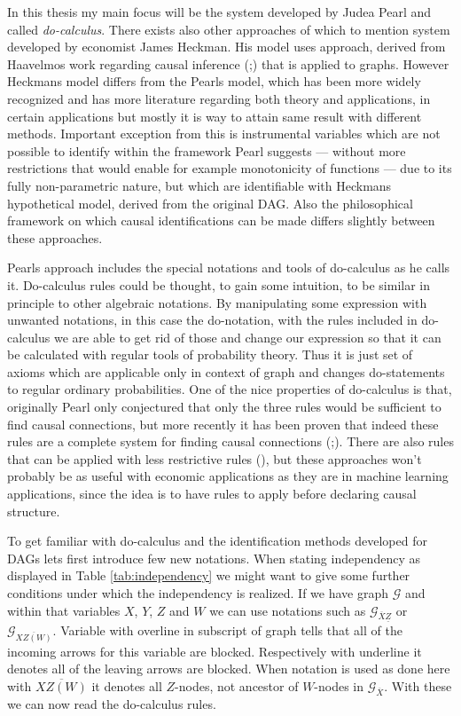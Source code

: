 \documentclass[main=english,12pt,a4paper,pdftex,econ,utf8]{aaltothesis}
\newcommand{\g}{\mathcal{G}}
\begin{document}


In this thesis my main focus will be the system developed by Judea Pearl and called \textit{do-calculus}. There exists also other approaches of which to mention system developed by economist James Heckman. His model uses approach, derived from Haavelmos work regarding causal inference (\cite{Haavelmo1943};\cite{Haavelmo1944}) that is applied to graphs. However Heckmans model differs from the Pearls model, which has been more widely recognized and has more literature regarding both theory and applications, in certain applications but mostly it is way to attain same result with different methods. Important exception from this is instrumental variables which are not possible to identify within the framework Pearl suggests --- without more restrictions that would enable for example monotonicity of functions --- due to its fully non-parametric nature, but which are identifiable with Heckmans hypothetical model, derived from the original DAG. Also the philosophical framework on which causal identifications can be made differs slightly between these approaches.

Pearls approach includes the special notations and tools of do-calculus as he calls it. Do-calculus rules could be thought, to gain some intuition, to be similar in principle to other algebraic notations. By manipulating some expression with unwanted notations, in this case the do-notation, with the rules included in do-calculus we are able to get rid of those and change our expression so that it can be calculated with regular tools of probability theory. Thus it is just set of axioms which are applicable only in context of graph and changes do-statements to regular ordinary probabilities. One of the nice properties of do-calculus is that, originally Pearl only conjectured that only the three rules would be sufficient to find causal connections, but more recently it has been proven that indeed these rules are a complete system for finding causal connections (\cite{Shpitser2006};\cite{Huang2006}). There are also rules that can be applied with less restrictive rules (\cite{Hyttinen2015}), but these approaches won't probably be as useful with economic applications as they are in machine learning applications, since the idea is to have rules to apply before declaring causal structure.

To get familiar with do-calculus and the identification methods developed for DAGs lets first introduce few new notations. When stating independency as displayed in Table \ref{tab:independency} we might want to give some further conditions under which the independency is realized. If we have graph $\g$ and within that variables $X$, $Y$, $Z$ and $W$ we can use notations such as $\g_{\overline{X}\underline{Z}}$ or $\g_{\overline{XZ(W)}}$. Variable with overline in subscript of graph tells that all of the incoming arrows for this variable are blocked. Respectively with underline it denotes all of the leaving arrows are blocked. When notation is used as done here with $\overline{XZ(W)}$ it denotes all $Z$-nodes, not ancestor of $W$-nodes in $\g_{\overline{X}}$. With these we can now read the do-calculus rules.
\end{document}

